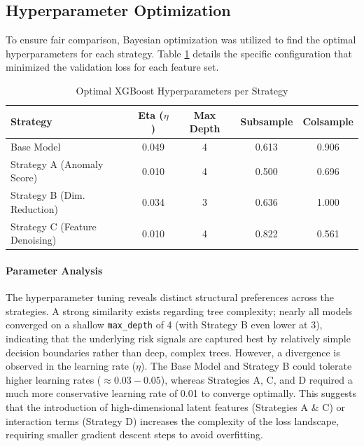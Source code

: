 \documentclass{report}\usepackage[]{graphicx}\usepackage[]{xcolor}
\begin{document}
\subsection{Hyperparameter Optimization}

To ensure fair comparison, Bayesian optimization was utilized to find the optimal hyperparameters for each strategy. Table \ref{tab:params} details the specific configuration that minimized the validation loss for each feature set.

\begin{table}[h]
    \centering
    \caption{Optimal XGBoost Hyperparameters per Strategy}
    \label{tab:params}
    \begin{tabular}{lcccc}
        \hline
        \textbf{Strategy} & \textbf{Eta ($\eta$)} & \textbf{Max Depth} & \textbf{Subsample} & \textbf{Colsample} \\
        \hline
        Base Model & 0.049 & 4 & 0.613 & 0.906 \\
        Strategy A (Anomaly Score) & 0.010 & 4 & 0.500 & 0.696 \\
        Strategy B (Dim. Reduction) & 0.034 & 3 & 0.636 & 1.000 \\
        Strategy C (Feature Denoising) & 0.010 & 4 & 0.822 & 0.561 \\
        \hline
    \end{tabular}
\end{table}

\paragraph{Parameter Analysis}
The hyperparameter tuning reveals distinct structural preferences across the strategies. A strong similarity exists regarding tree complexity; nearly all models converged on a shallow \texttt{max\_depth} of 4 (with Strategy B even lower at 3), indicating that the underlying risk signals are captured best by relatively simple decision boundaries rather than deep, complex trees. However, a divergence is observed in the learning rate ($\eta$). The Base Model and Strategy B could tolerate higher learning rates ($\approx 0.03 - 0.05$), whereas Strategies A, C, and D required a much more conservative learning rate of 0.01 to converge optimally. This suggests that the introduction of high-dimensional latent features (Strategies A \& C) or interaction terms (Strategy D) increases the complexity of the loss landscape, requiring smaller gradient descent steps to avoid overfitting.
\end{document}
